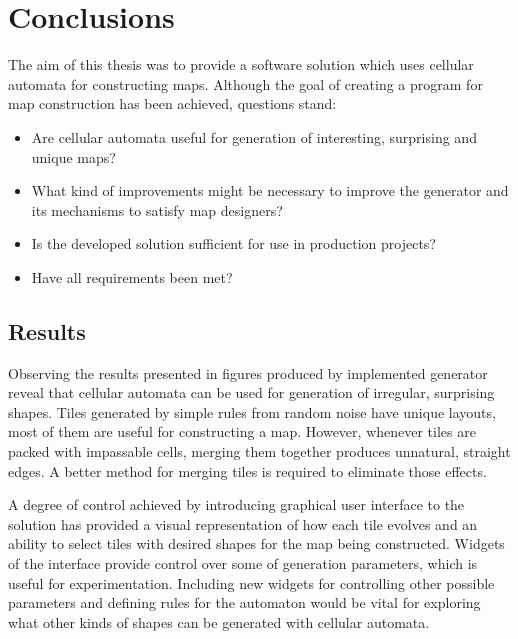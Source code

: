 \documentclass[12pt]{report}
\begin{document}
\chapter{Conclusions} \label{rozdzial.podsumowanie}

The aim of this thesis was to provide a software solution which uses cellular automata for constructing maps. Although the goal of creating a program for map construction has been achieved, questions stand: 

\begin{itemize}
	\item Are cellular automata useful for generation of interesting, surprising and unique maps?
	\item What kind of improvements might be necessary to improve the generator and its mechanisms to satisfy map designers? 
	\item Is the developed solution sufficient for use in production projects?  
	\item Have all requirements been met?
\end{itemize}


\section{Results}

Observing the results presented in figures produced by implemented generator reveal that cellular automata can be used for generation of irregular, surprising shapes. Tiles generated by simple rules from random noise have unique layouts, most of them are useful for constructing a map. However, whenever tiles are packed with impassable cells, merging them together produces unnatural, straight edges. A better method for merging tiles is required to eliminate those effects.

A degree of control achieved by introducing graphical user interface to the solution has provided a visual representation of how each tile evolves and an ability to select tiles with desired shapes for the map being constructed. Widgets of the interface provide control over some of generation parameters, which is useful for experimentation. Including new widgets for controlling other possible parameters and defining rules for the automaton would be vital for exploring what other kinds of shapes can be generated with cellular automata. 
 
\end{document}
